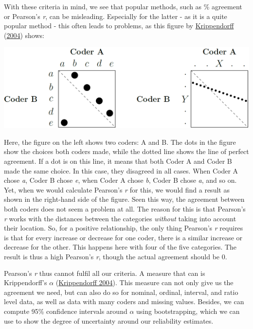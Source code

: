 \documentclass[
]{book}
\begin{document}
With these criteria in mind, we see that popular methods, such as \% agreement or Pearson's \emph{r}, can be misleading. Especially for the latter - as it is a quite popular method - this often leads to problems, as this figure by \protect\hyperlink{ref-Krippendorff2004a}{Krippendorff} (\protect\hyperlink{ref-Krippendorff2004a}{2004}) shows:

\begin{center}\includegraphics[width=0.75\linewidth]{figures/observers} \end{center}

Here, the figure on the left shows two coders: A and B. The dots in the figure show the choices both coders made, while the dotted line shows the line of perfect agreement. If a dot is on this line, it means that both Coder A and Coder B made the same choice. In this case, they disagreed in all cases. When Coder A chose \emph{a}, Coder B chose \emph{e}, when Coder A chose \emph{b}, Coder B chose \emph{a}, and so on. Yet, when we would calculate Pearson's \emph{r} for this, we would find a result as shown in the right-hand side of the figure. Seen this way, the agreement between both coders does not seem a problem at all. The reason for this is that Pearson's \emph{r} works with the distances between the categories \emph{without} taking into account their location. So, for a positive relationship, the only thing Pearson's \emph{r} requires is that for every increase or decrease for one coder, there is a similar increase or decrease for the other. This happens here with four of the five categories. The result is thus a high Pearson's \emph{r}, though the actual agreement should be 0.

Pearson's \emph{r} thus cannot fulfil all our criteria. A measure that can is Krippendorff's \(\alpha\) (\protect\hyperlink{ref-Krippendorff2004a}{Krippendorff 2004}). This measure can not only give us the agreement we need, but can also do so for nominal, ordinal, interval, and ratio level data, as well as data with many coders and missing values. Besides, we can compute 95\% confidence intervals around \(\alpha\) using bootstrapping, which we can use to show the degree of uncertainty around our reliability estimates.
\end{document}

